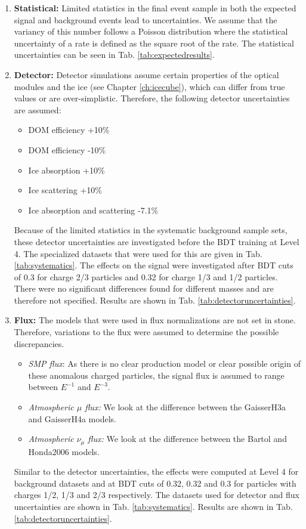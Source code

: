 \begin{enumerate}
\item \textbf{Statistical:} Limited statistics in the final event sample in both the expected signal and background events lead to uncertainties. We assume that the variancy of this number follows a Poisson distribution where the statistical uncertainty of a rate is defined as the square root of the rate. The statistical uncertainties can be seen in Tab. \ref{tab:expectedresults}.
\item \textbf{Detector: } Detector simulations assume certain properties of the optical modules and the ice (see Chapter \ref{ch:icecube}), which can differ from true values or are over-simplistic. Therefore, the following detector uncertainties are assumed:
\vspace{2mm}
\begin{itemize}
\item DOM efficiency +10\%
\item DOM efficiency -10\%
\item Ice absorption +10\%
\item Ice scattering +10\%
\item Ice absorption and scattering -7.1\%
\end{itemize}
\vspace{2mm}
Because of the limited statistics in the systematic background sample sets, these detector uncertainties are investigated before the BDT training at Level 4. The specialized datasets that were used for this are given in Tab. \ref{tab:systematics}. The effects on the signal were investigated after BDT cuts of 0.3 for charge 2/3 particles and 0.32 for charge 1/3 and 1/2 particles. There were no significant differences found for different masses and are therefore not specified. Results are shown in Tab. \ref{tab:detectoruncertainties}.
\item \textbf{Flux: }The models that were used in flux normalizations are not set in stone. Therefore, variations to the flux were assumed to determine the possible discrepancies.
\begin{itemize}
\item \textit{SMP flux}: As there is no clear production model or clear possible origin of these anomalous charged particles, the signal flux is assumed to range between $E^{-1}$ and $E^{-3}$. 
\item \textit{Atmospheric $\mu$ flux: }We look at the difference between the GaisserH3a \cite{Gaisser:2013bla} and GaisserH4a \cite{Gaisser:2011cc} models.
\item \textit{Atmospheric $\nu_\mu$ flux: }We look at the difference between the Bartol \cite{PhysRevD.70.023006} and Honda2006 \cite{Honda:2006qj} models.
\end{itemize}
Similar to the detector uncertainties, the effects were computed at Level 4 for background datasets and at BDT cuts of 0.32, 0.32 and 0.3 for particles with charges 1/2, 1/3 and 2/3 respectively. The datasets used for detector and flux uncertainties are shown in Tab. \ref{tab:systematics}. Results are shown in Tab. \ref{tab:detectoruncertainties}. 


\end{enumerate}
